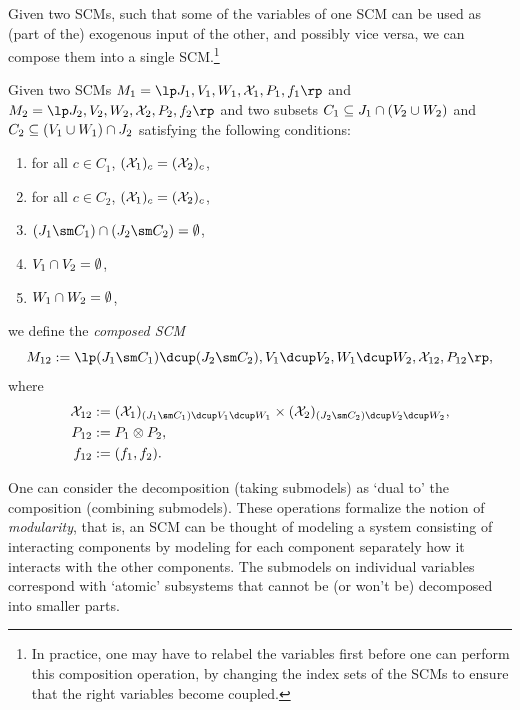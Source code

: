 Given two SCMs, such that some of the variables of one SCM can be used as (part of the) exogenous input of the other, and possibly vice versa, we can compose them into a single SCM.\footnote{In practice, one may have to relabel the variables first before one can perform this composition operation, by changing the index sets of the SCMs to ensure that the right variables become coupled.}
\begin{Def}\label{def:compose_scm}
  Given two SCMs $M_1 = \lt \Sin_1, \Send_1, \Srnd_1, \CX_1, P_1, f_1 \rt$ and $M_2 = \lt \Sin_2, \Send_2, \Srnd_2, \CX_2, P_2, f_2 \rt$ and two subsets $C_1 \subseteq J_1 \cap (V_2 \cup W_2)$ and $C_2 \subseteq (V_1 \cup W_1) \cap J_2$ satisfying the following conditions:
  \begin{enumerate}
    \item for all $c \in C_1$, $(\mathcal{X}_1)_c = (\mathcal{X}_2)_c$,
    \item for all $c \in C_2$, $(\mathcal{X}_1)_c = (\mathcal{X}_2)_c$,
    \item $(\Sin_1 \sm C_1) \cap (\Sin_2 \sm C_2) = \emptyset$,
    \item $V_1 \cap V_2 = \emptyset$,
    \item $W_1 \cap W_2 = \emptyset$,
  \end{enumerate}
  we define the \emph{composed SCM}
  $$M_{12} := \lt (\Sin_1 \sm C_1) \dcup (\Sin_2 \sm C_2), \Send_1 \dcup \Send_2, \Srnd_1 \dcup \Srnd_2, \CX_{12}, P_{12} \rt,$$
  where
  \begin{align*}
    \CX_{12} &:= (\CX_1)_{(\Sin_1 \sm C_1) \dcup \Send_1 \dcup \Srnd_1} \times (\CX_2)_{(\Sin_2 \sm C_2) \dcup \Send_2 \dcup \Srnd_2}, \\
    P_{12} &:= P_1 \otimes P_2, \\
    f_{12} &:= (f_1, f_2).
  \end{align*}
\end{Def}

One can consider the decomposition (taking submodels) as `dual to' the composition (combining submodels).
These operations formalize the notion of \emph{modularity}, that is, an SCM can be thought of modeling a system consisting of interacting components by modeling for each component separately how it interacts with the other components.
The submodels on individual variables correspond with `atomic' subsystems that cannot be (or won't be) decomposed into smaller parts.
